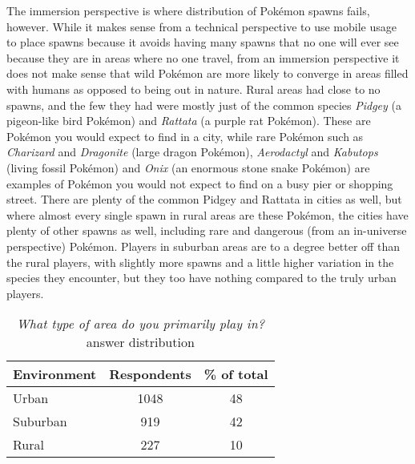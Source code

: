 The immersion perspective is where distribution of Pokémon spawns fails, however. While it makes sense from a technical perspective to use mobile usage to place spawns because it avoids having many spawns that no one will ever see because they are in areas where no one travel, from an immersion perspective it does not make sense that wild Pokémon are more likely to converge in areas filled with humans as opposed to being out in nature. Rural areas had close to no spawns, and the few they had were mostly just of the common species \emph{Pidgey} (a pigeon-like bird Pokémon) and \emph{Rattata} (a purple rat Pokémon). These are Pokémon you would expect to find in a city, while rare Pokémon such as \emph{Charizard} and \emph{Dragonite} (large dragon Pokémon), \emph{Aerodactyl} and \emph{Kabutops} (living fossil Pokémon) and \emph{Onix} (an enormous stone snake Pokémon) are examples of Pokémon you would not expect to find on a busy pier or shopping street. There are plenty of the common Pidgey and Rattata in cities as well, but where almost every single spawn in rural areas are these Pokémon, the cities have plenty of other spawns as well, including rare and dangerous (from an in-universe perspective) Pokémon. Players in suburban areas are to a degree better off than the rural players, with slightly more spawns and a little higher variation in the species they encounter, but they too have nothing compared to the truly urban players.


\begin{table}[h]
	\centering
	\caption{\emph{What type of area do you primarily play in?} answer distribution}
	\label{tbl:urban-level-distribution}
	\begin{tabular}{|l|c|c|}
		\hline
		\textbf{Environment} & \textbf{Respondents} & \textbf{\% of total}\\\hline\hline
		Urban & 1048 & 48\\\hline
		Suburban & 919 & 42\\\hline
		Rural & 227 & 10\\\hline
	\end{tabular}
\end{table}

